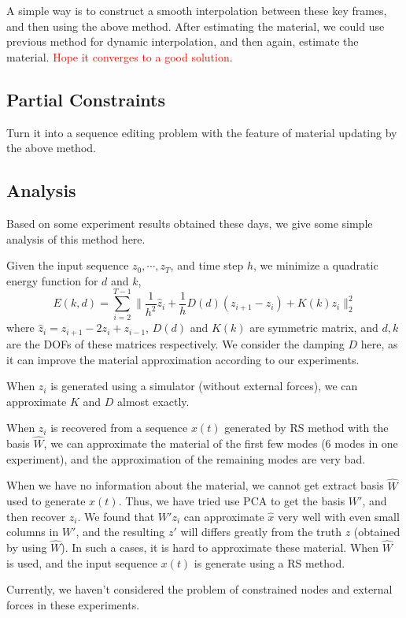 \documentclass[9pt,twocolumn]{extarticle}
\newcommand{\TODO}[1]{\textcolor{red}{#1}}
\begin{document}
A simple way is to construct a smooth interpolation between these key
frames, and then using the above method.  After estimating the
material, we could use previous method for dynamic interpolation, and
then again, estimate the material.  \TODO{Hope it converges to a good
  solution}.

\subsection{Partial Constraints}
Turn it into a sequence editing problem with the feature of material
updating by the above method.

\subsection{Analysis}
Based on some experiment results obtained these days, we give some simple
analysis of this method here.

Given the input sequence $z_0,\cdots,z_T$, and time step $h$, we minimize a
quadratic energy function for $d$ and $k$,
\begin{equation} \label{qua-en}
  E(k,d) = \sum_{i=2}^{T-1} \|\frac{1}{h^2}\hat{z}_i+\frac{1}{h}{D}(d)(z_{i+1}-z_{i})+ K(k)z_i\|_2^2
\end{equation}
where $\hat{z}_i=z_{i+1}-2z_{i}+z_{i-1}$, ${D}(d)$ and $K(k)$ are
symmetric matrix, and $d, k$ are the DOFs of these matrices
respectively. We consider the damping $D$ here, as it can improve the
material approximation according to our experiments.

When $z_i$ is generated using a simulator (without external forces),
we can approximate $K$ and $D$ almost exactly.

When $z_i$ is recovered from a sequence $x(t)$ generated by RS method
with the basis $\hat{W}$, we can approximate the material of the first
few modes (6 modes in one experiment), and the approximation of the
remaining modes are very bad.

When we have no information about the material, we cannot get extract
basis $\hat{W}$ used to generate $x(t)$.  Thus, we have tried use PCA
to get the basis $W'$, and then recover $z_i$.  We found that $W'z_i$
can approximate $\hat{x}$ very well with even small columns in $W'$,
and the resulting $z'$ will differs greatly from the truth $z$
(obtained by using $\hat{W}$).  In such a cases, it is hard to
approximate these material. When $\hat{W}$ is used, and the input
sequence $x(t)$ is generate using a RS method.

Currently, we haven't considered the problem of constrained nodes and
external forces in these experiments.
\end{document}
